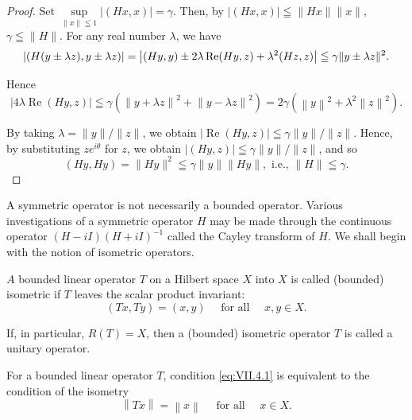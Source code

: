 \begin{proof}
 Set $\sup\limits_{\|x\|\leqq 1}|(Hx,x)| = \gamma$. Then, by $|(Hx,x)|\leqq \|Hx\|\|x\|,$ $\gamma \leqq \|H\|$. For any real number $\lambda$, we have 
\begin{equation}\left| (H (y \pm \lambda z), y \pm \lambda z) \right| = \left| (H y, y) \pm 2 \lambda \operatorname{Re} (H y, z) + \lambda^{2} (H z, z) \right| \leqq \gamma \| y \pm \lambda z \| ^{2}. \notag\end{equation}

Hence 
\[
\left| 4 \lambda \operatorname{Re} (H y, z) \right| \leqq \gamma (\left\| y + \lambda z \right\| ^{2} + \left\| y - \lambda z \right\| ^{2}) = 2 \gamma (\left\| y \right\| ^{2} + \lambda^{2} \left\| z \right\| ^{2}).
\]

By taking $\lambda = \|y\|/\|z\|$, we obtain $|\operatorname{Re}(Hy,z)| \leqq \gamma \|y\|/\|z\|$. Hence, by substituting $ze^{i\theta}$ for $z$, we obtain $|(Hy,z)| \leqq \gamma \|y\|/\|z\|$, and so 
\[
(H y, H y) = \| H y \| ^{2} \leqq \gamma \| y \| \| H y \|, \text{ i.e., } \| H \| \leqq \gamma .
\]
\end{proof}


\label{sec:VII.4}

A symmetric operator is not necessarily a bounded operator. Various investigations of a symmetric operator $H$ may be made through the continuous operator $(H - iI)(H + iI)^{-1}$ called the Cayley transform of $H$. We shall begin with the notion of isometric operators. 

\begin{definition}\label{def:VII.4.Definition.1} $A$ bounded linear operator $T$ on a Hilbert space $X$ into $X$ is called (bounded) isometric if $T$ leaves the scalar product invariant: 
\begin{equation}\label{eq:VII.4.1}
(T x, T y) = (x, y) \quad \text{ for all } \quad x, y \in X.
\end{equation}
\end{definition}

If, in particular, $R(T) = X$, then a (bounded) isometric operator $T$ is called a unitary operator. 

\begin{proposition}\label{prop:VII.4.Proposition.1} For a bounded linear operator $T$, condition \eqref{eq:VII.4.1} is equivalent to the condition of the isometry 
\begin{equation}\label{eq:VII.4.2}
\left\| T x \right\| = \left\| x \right\| \quad \text{ for all } \quad x \in X.
\end{equation}
\end{proposition}

